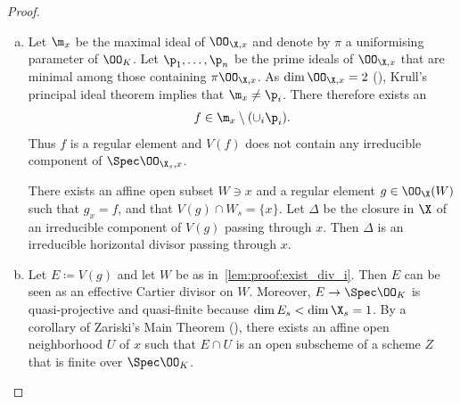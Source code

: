 \begin{proof}
    \begin{enumerate}[(a)]
        \item Let $\m_x$ be the maximal ideal of $\OO_{\X,x}$ and denote by $\pi$ a uniformising parameter of $\OO_K$.
            Let $ \p_1, \dots, \p_n $ be the prime ideals of $\OO_{\X,x}$ that are minimal among those containing $\pi \OO_{\X,x}$.
            As $\dim{}\OO_{\X,x} = 2$ (\cite[Proposition 8.3.4]{Liu}), Krull's principal ideal theorem implies that $\m_x \not= \p_i$.
            There therefore exists an
            \[
                f \in \m_x \setminus (\cup_i \p_i).
            \]
            Thus $f$ is a regular element and $V(f)$ does not contain any irreducible component of $\Spec \OO_{\X_s, x}$.

            There exists an affine open subset $W \ni x$ and a regular element $g \in \OO_\X(W)$ such that $g_x = f$,
            and that $V(g) \cap W_s = \{x\}$.
            Let $\Delta$ be the closure in $\X$ of an irreducible component of $V(g)$ passing through $x$.
            Then $\Delta$ is an irreducible horizontal divisor passing through $x$. \label{lem:proof:exist_div_i}
        \item Let $E \coloneqq V(g)$ and let $W$ be as in~\ref{lem:proof:exist_div_i}.
            Then $E$ can be seen as an effective Cartier divisor on $W$.
            Moreover, $E \to \Spec \OO_K$ is quasi-projective and quasi-finite because $\dim{}E_s < \dim{}\X_s = 1$.
            By a corollary of Zariski's Main Theorem (\cite[Corollary 4.4.8]{Liu}), there exists an affine open neighborhood
            $U$ of $x$ such that $E \cap U$ is an open subscheme of a scheme $Z$ that is finite over $\Spec \OO_K$.

            \begin{center}
            \end{center}


\end{enumerate}
\end{proof}
